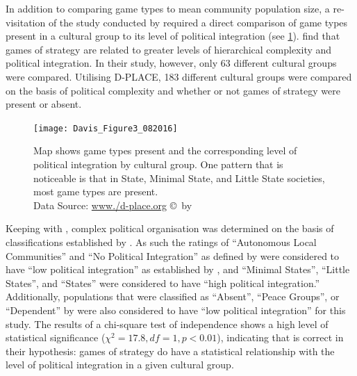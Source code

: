 \documentclass[%
	]{ijsra}
\begin{document}
In addition to comparing game types to mean community population size, a re-visitation of the study conducted by  \textcite{roberts1959} required a direct comparison of game types present in a cultural group to its level of political integration (see \cref{fig:Figure3_Davis_082016}).  \textcite{roberts1959} find that games of strategy are related to greater levels of hierarchical complexity and political integration. In their study, however, only 63 different cultural groups were compared. Utilising D-PLACE, 183 different cultural groups were compared on the basis of political complexity and whether or not games of strategy were present or absent.

\begin{figure} [!htb] %
	\texttt{[image: Davis\_Figure3\_082016]}
	\caption{Map shows game types present and the corresponding level of political integration by cultural group. One pattern that is noticeable is that in State, Minimal State, and Little State societies, most game types are present.
	{\normalfont\scriptsize \\ Data Source: \href{http:/www./d-place.org}{www./d-place.org} \copyright\ by 
                 \shortauthor
                  }}
	\label{fig:Figure3_Davis_082016}
\end{figure}

Keeping with \textcite{roberts1959}, complex political organisation was determined on the basis of classifications established by \textcite{murdock1957}. As such the ratings of ``Autonomous Local Communities” and ``No Political Integration” as defined by \textcite{murdock1957} were considered to have ``low political integration” as established by \textcite{roberts1959}, and ``Minimal States”, ``Little States”, and ``States” were considered to have ``high political integration.” Additionally, populations that were classified as ``Absent”, ``Peace Groups”, or ``Dependent” by \textcite{murdock1957} were also considered to have ``low political integration” for this study. The results of a chi-square test of independence shows a high level of statistical significance ($\chi^{2} = 17.8, df = 1, p < 0.01$), indicating that \textcite{roberts1959} is correct in their hypothesis: games of strategy do have a statistical relationship with the level of political integration in a given cultural group.
\end{document}
